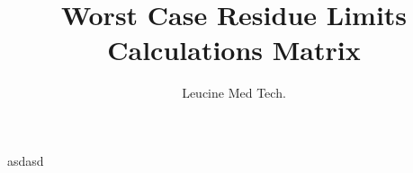 \documentclass{report}
\title{Worst Case Residue Limits Calculations Matrix}
\author{Leucine Med Tech.}
\begin{document}
\maketitle
asdasd
\end{document}
